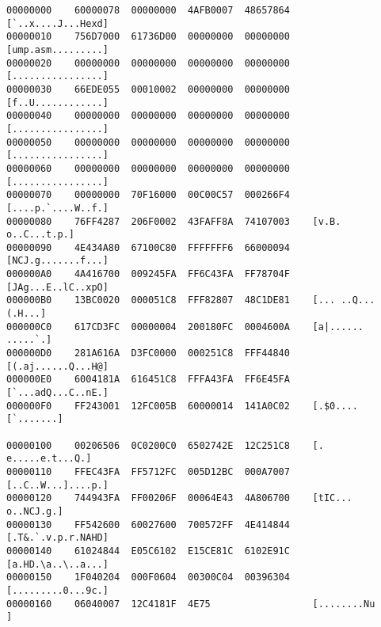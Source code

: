 \begin{lstlisting}[frame=none,numbers=none,caption={Example Hexdump Output}]
00000000    60000078  00000000  4AFB0007  48657864    [`..x....J...Hexd]
00000010    756D7000  61736D00  00000000  00000000    [ump.asm.........]
00000020    00000000  00000000  00000000  00000000    [................]
00000030    66EDE055  00010002  00000000  00000000    [f..U............]
00000040    00000000  00000000  00000000  00000000    [................]
00000050    00000000  00000000  00000000  00000000    [................]
00000060    00000000  00000000  00000000  00000000    [................]
00000070    00000000  70F16000  00C00C57  000266F4    [....p.`....W..f.]
00000080    76FF4287  206F0002  43FAFF8A  74107003    [v.B. o..C...t.p.]
00000090    4E434A80  67100C80  FFFFFFF6  66000094    [NCJ.g.......f...]
000000A0    4A416700  009245FA  FF6C43FA  FF78704F    [JAg...E..lC..xpO]
000000B0    13BC0020  000051C8  FFF82807  48C1DE81    [... ..Q...(.H...]
000000C0    617CD3FC  00000004  200180FC  0004600A    [a|...... .....`.]
000000D0    281A616A  D3FC0000  000251C8  FFF44840    [(.aj......Q...H@]
000000E0    6004181A  616451C8  FFFA43FA  FF6E45FA    [`...adQ...C..nE.]
000000F0    FF243001  12FC005B  60000014  141A0C02    [.$0....[`.......]

00000100    00206506  0C0200C0  6502742E  12C251C8    [. e.....e.t...Q.]
00000110    FFEC43FA  FF5712FC  005D12BC  000A7007    [..C..W...]....p.]
00000120    744943FA  FF00206F  00064E43  4A806700    [tIC... o..NCJ.g.]
00000130    FF542600  60027600  700572FF  4E414844    [.T&.`.v.p.r.NAHD]
00000140    61024844  E05C6102  E15CE81C  6102E91C    [a.HD.\a..\..a...]
00000150    1F040204  000F0604  00300C04  00396304    [.........0...9c.]
00000160    06040007  12C4181F  4E75                  [........Nu      ]
\end{lstlisting}

